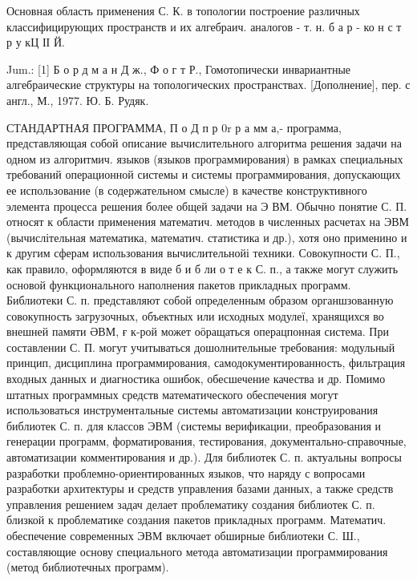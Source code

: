 \documentclass[10pt]{article}
\begin{document}
Основная область применения С. К. в топологии построение различных классифицирующих пространств и их алгебраич. аналогов - т. н. б а р - ко н с т р у кЦ ІІ Й.



Jum.: [1] Б о р д м а н Д ж., Ф о г т Р., Гомотопически инвариантные алгебраические структуры на топологических пространствах. [Дополнение], пер. с англ., М., 1977. Ю. Б. Рудяк.



СТАНДАРТНАЯ ПРОГРАММА, П о Д п р $0 \mathrm{r}$ р а мм а,- программа, представляющая собой описание вычислительного алгоритма решения задачи на одном из алгоритмич. языков (языков программирования) в рамках специальных требований операционной системы и системы программирования, допускающих ее использование (в содержательном смысле) в качестве конструктивного элемента процесса решения более общей задачи на Э ВМ. Обычно понятие С. П. относят к области применения математич. методов в численных расчетах на ЭВМ (вычислітельная математика, математич. статистика и др.), хотя оно применино и к другим сферам использования вычислительнойі техники. Совокупности С. П., как правило, оформляются в виде б и б ли о т е к С. п., а также могут служить основой функционального наполнения пакетов прикладных программ. Библиотеки С. п. представляют собой определенным образом органшзованную совокупность загрузочных, объектных или исходных модулеї, хранящихся во внешней памяти ӘВМ, ғ к-рой может оӧращаться операцпонная система. При составлении С. П. могут учитываться дошолнительные требования: модульный принцип, дисциплина программирования, самодокументированность, фильтрация входных данных и диагностика ошибок, обесшечение качества и др. Помимо штатных программных средств математического обеспечения могут использоваться инструментальные системы автоматизации конструирования библиотек С. п. для классов ЭВМ (системы верификации, преобразования и генерации программ, форматирования, тестирования, документально-справочные, автоматизации комментирования и др.). Для библиотек С. п. актуальны вопросы разработки проблемно-ориентированных языков, что наряду с вопросами разработки архитектуры и средств управления базами данных, а также средств управления решением задач делает проблематику создания библиотек С. п. близкой к проблематике создания пакетов прикладных программ. Математич. обеспечение современных ЭВМ включает обширные библиотеки С. Ш., составляющие основу специального метода автоматизации программирования (метод библиотечных программ).
\end{document}
